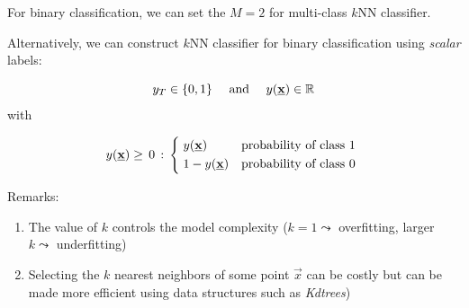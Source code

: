 \begin{frame}\frametitle{\subsubsecname}

For binary classification, we can set the $M=2$ for multi-class $k$NN classifier.

Alternatively, we can construct $k$NN classifier for binary classification using \emph{scalar} labels:

\begin{equation}
y_T \in \{0,1\}\quad \text{ and }\quad y(\underline{\mathbf{x}}) \in \mathbb{R}
\end{equation}
with

\begin{equation}
y(\vec x) \ge\,0\,:\,
\begin{cases*}
      \;y(\vec x) & probability of class $1$ \\
      \;1-y(\vec x)     & probability of class $0$
    \end{cases*}
\end{equation}


\pause


Remarks:
\begin{enumerate}
\item The value of $k$ controls the model complexity ($k = 1 \leadsto$ overfitting, larger $k \leadsto$ underfitting)
\item Selecting the $k$ nearest neighbors of some point $\vec x$ can be costly but can be made more efficient using data structures such as \emph{Kdtrees})
\end{enumerate}

\end{frame}
